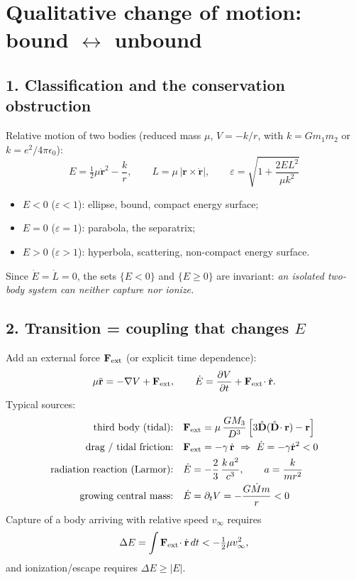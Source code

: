 \documentclass{article}
\begin{document}
\section*{Qualitative change of motion: bound $\leftrightarrow$ unbound}

\subsection*{1. Classification and the conservation obstruction}
Relative motion of two bodies (reduced mass $\mu$, $V=-k/r$, with
$k=Gm_1m_2$ or $k=e^2/4\pi\epsilon_0$):
\begin{equation}
E=\tfrac12\mu\dot{\mathbf r}^{2}-\frac{k}{r},\qquad
L=\mu\,|\mathbf r\times\dot{\mathbf r}|,\qquad
\varepsilon=\sqrt{1+\frac{2EL^{2}}{\mu k^{2}}}
\end{equation}
\begin{itemize}
  \item $E<0$ ($\varepsilon<1$): ellipse, bound, compact energy surface;
  \item $E=0$ ($\varepsilon=1$): parabola, the separatrix;
  \item $E>0$ ($\varepsilon>1$): hyperbola, scattering, non-compact energy surface.
\end{itemize}
Since $\dot E=\dot L=0$, the sets $\{E<0\}$ and $\{E\ge0\}$ are invariant:
\emph{an isolated two-body system can neither capture nor ionize.}

\subsection*{2. Transition = coupling that changes $E$}
Add an external force $\mathbf F_{\rm ext}$ (or explicit time dependence):
\begin{equation}
\mu\ddot{\mathbf r}=-\nabla V+\mathbf F_{\rm ext},\qquad
\dot E=\frac{\partial V}{\partial t}+\mathbf F_{\rm ext}\!\cdot\dot{\mathbf r}.
\end{equation}
Typical sources:
\begin{align}
\text{third body (tidal):}\quad
&\mathbf F_{\rm ext}=\mu\,\frac{GM_3}{D^{3}}
\left[3\hat{\mathbf D}(\hat{\mathbf D}\!\cdot\mathbf r)-\mathbf r\right]\\
\text{drag / tidal friction:}\quad
&\mathbf F_{\rm ext}=-\gamma\,\dot{\mathbf r}\ \Rightarrow\ \dot E=-\gamma\dot{\mathbf r}^{2}<0\\
\text{radiation reaction (Larmor):}\quad
&\dot E=-\frac{2}{3}\,\frac{k\,a^{2}}{c^{3}},\qquad a=\frac{k}{m r^{2}}\\
\text{growing central mass:}\quad
&\dot E=\partial_tV=-\frac{G\dot M m}{r}<0
\end{align}
Capture of a body arriving with relative speed $v_\infty$ requires
\begin{equation}
\Delta E=\int \mathbf F_{\rm ext}\!\cdot\dot{\mathbf r}\,dt<-\tfrac12\mu v_\infty^{2},
\end{equation}
and ionization/escape requires $\Delta E\ge|E|$.
\end{document}
